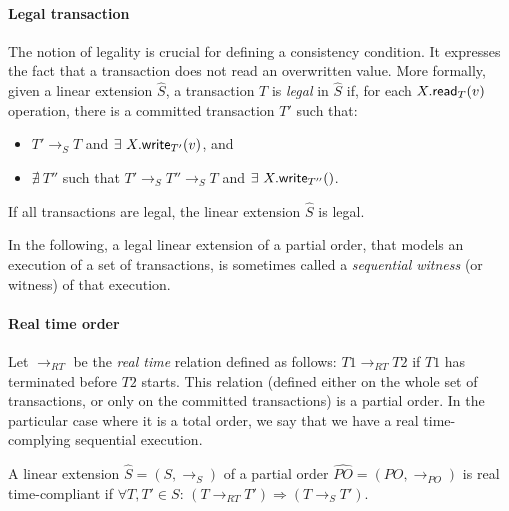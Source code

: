 \paragraph{Legal transaction}
The notion of legality is crucial for defining a consistency condition. 
It expresses the fact that a transaction does not read an overwritten value. 
More  formally, given a  linear extension $\widehat{S}$,  a  transaction $T$   
is {\it legal}  in $\widehat{S}$   if, 
for each $X.{\sf read}_{T}(v)$  operation, there is a committed 
transaction $T'$ such that: 
%
\begin{itemize}
%
\vspace{-0.2cm}
\item $T'  \rightarrow_S T$ and $\exists~ X.{\sf write}_{T'}(v)$, and  
%
\vspace{-0.2cm}
\item $\nexists~ T''$ such that 
$T'  \rightarrow_S T'' \rightarrow_S T$ and $\exists~ X.{\sf write}_{T''}()$. 
\end{itemize}
\vspace{-0.2cm}
%
If all transactions are legal, the linear extension  $\widehat{S}$ is legal. 


In the following,  a  legal  linear extension  of a  partial  order, that
models an  execution of a set  of transactions,  is sometimes called a 
{\it sequential witness} (or witness) of that execution. 


\paragraph{Real time order}
Let $\rightarrow_\mathit{RT}$  be the {\it  real time} relation  defined as
follows:  $T1  \rightarrow_\mathit{RT} T2$  if  $T1$  has terminated 
before  $T2$ starts. 
This relation (defined either on  the whole set of  transactions, or only  
on the committed transactions) is  a partial order.  In the  particular case
where it is  a total order,  we  say that we have a real time-complying
sequential execution. 

A linear extension  $\widehat{S}=(S,\rightarrow_{S})$ of a partial order 
$\widehat{PO}=(PO,\rightarrow_{PO})$ is real time-compliant if 
$\forall T,T'\in S$: 
$ (T \rightarrow_\mathit{RT} T')  \Rightarrow  (T \rightarrow_{S} T')$.



